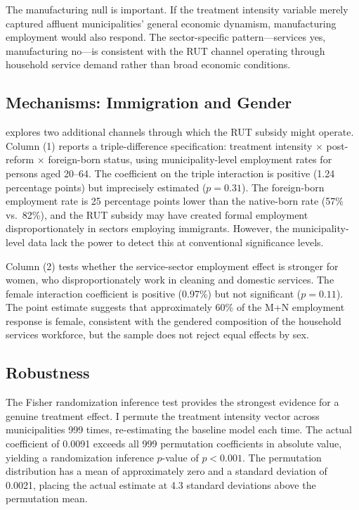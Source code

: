\documentclass[12pt]{article}
\begin{document}
The manufacturing null is important. If the treatment intensity variable merely captured affluent municipalities' general economic dynamism, manufacturing employment would also respond. The sector-specific pattern---services yes, manufacturing no---is consistent with the RUT channel operating through household service demand rather than broad economic conditions.



\subsection{Mechanisms: Immigration and Gender}

 explores two additional channels through which the RUT subsidy might operate. Column (1) reports a triple-difference specification: treatment intensity $\times$ post-reform $\times$ foreign-born status, using municipality-level employment rates for persons aged 20--64. The coefficient on the triple interaction is positive (1.24 percentage points) but imprecisely estimated ($p = 0.31$). The foreign-born employment rate is 25 percentage points lower than the native-born rate (57\% vs.\ 82\%), and the RUT subsidy may have created formal employment disproportionately in sectors employing immigrants. However, the municipality-level data lack the power to detect this at conventional significance levels.

Column (2) tests whether the service-sector employment effect is stronger for women, who disproportionately work in cleaning and domestic services. The female interaction coefficient is positive (0.97\%) but not significant ($p = 0.11$). The point estimate suggests that approximately 60\% of the M+N employment response is female, consistent with the gendered composition of the household services workforce, but the sample does not reject equal effects by sex.



\subsection{Robustness}

The Fisher randomization inference test provides the strongest evidence for a genuine treatment effect. I permute the treatment intensity vector across municipalities 999 times, re-estimating the baseline model each time. The actual coefficient of 0.0091 exceeds all 999 permutation coefficients in absolute value, yielding a randomization inference $p$-value of $p < 0.001$. The permutation distribution has a mean of approximately zero and a standard deviation of 0.0021, placing the actual estimate at 4.3 standard deviations above the permutation mean.
\end{document}
